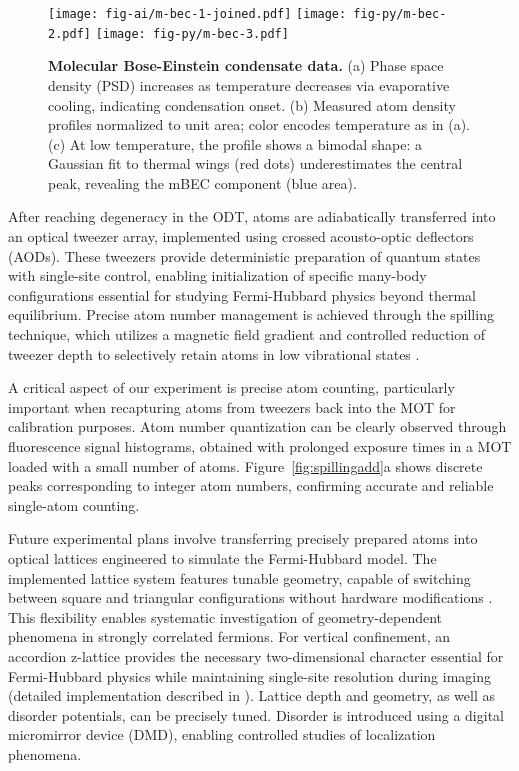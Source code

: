 \begin{figure}
    \centering
    \texttt{[image: fig-ai/m-bec-1-joined.pdf]}
    \texttt{[image: fig-py/m-bec-2.pdf]}
    \texttt{[image: fig-py/m-bec-3.pdf]}
    \caption[Molecular Bose-Einstein condensate]{
        \textbf{Molecular Bose-Einstein condensate data.}
        (a) Phase space density (PSD) increases as temperature decreases via evaporative cooling, indicating condensation onset. 
        (b) Measured atom density profiles normalized to unit area; color encodes temperature as in (a).
        (c) At low temperature, the profile shows a bimodal shape: a Gaussian fit to thermal wings (red dots) underestimates the central peak, revealing the mBEC component (blue area).
    }
    \label{fig:mbec}
\end{figure}



After reaching degeneracy in the ODT, atoms are adiabatically transferred into an optical tweezer array, implemented using crossed acousto-optic deflectors (AODs). These tweezers provide deterministic preparation of quantum states with single-site control, enabling initialization of specific many-body configurations essential for studying Fermi-Hubbard physics beyond thermal equilibrium. Precise atom number management is achieved through the spilling technique, which utilizes a magnetic field gradient and controlled reduction of tweezer depth to selectively retain atoms in low vibrational states \cite{culemann_construction_2024, huang_construction_2024}.

A critical aspect of our experiment is precise atom counting, particularly important when recapturing atoms from tweezers back into the MOT for calibration purposes. Atom number quantization can be clearly observed through fluorescence signal histograms, obtained with prolonged exposure times in a MOT loaded with a small number of atoms. Figure~\ref{fig:spillingadd}a shows discrete peaks corresponding to integer atom numbers, confirming accurate and reliable single-atom counting.

Future experimental plans involve transferring precisely prepared atoms into optical lattices engineered to simulate the Fermi-Hubbard model. The implemented lattice system features tunable geometry, capable of switching between square and triangular configurations without hardware modifications \cite{dux_optical_2023}. This flexibility enables systematic investigation of geometry-dependent phenomena in strongly correlated fermions. For vertical confinement, an accordion z-lattice provides the necessary two-dimensional character essential for Fermi-Hubbard physics while maintaining single-site resolution during imaging (detailed implementation described in \cite{huang_construction_2024}). Lattice depth and geometry, as well as disorder potentials, can be precisely tuned. Disorder is introduced using a digital micromirror device (DMD), enabling controlled studies of localization phenomena. 

